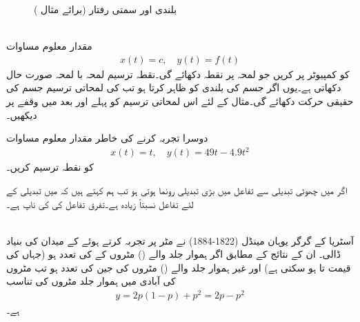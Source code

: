 %
\begin{figure}
\centering
{}
\caption{بلندی اور سمتی رفتار (برائے مثال )}
\label{شکل_مثال_تفرق_آزاد_گرنا}
\end{figure}

 \quad {} \\
مقدار معلوم مساوات
\begin{align*}
x(t)=c,\quad y(t)=f(t)
\end{align*}
کو کمپیوٹر پر   کریں جو لمحہ  پر نقطہ  دکھائے گی۔نقطہ ترسیم لمحہ با لمحہ صورت حال دکھاتی ہے۔یوں اگر  جسم کی بلندی کو ظاہر کرتا ہو تب  کی لمحاتی ترسیم جسم کی حقیقی حرکت دکھائے گی۔مثال  کے لئے اس لمحاتی ترسیم کو پہلے  اور بعد میں  وقفے پر دیکھیں۔

دوسرا تجربہ کرنے کی خاطر مقدار معلوم مساوات
\begin{align*}
x(t)=t,\quad y(t)=49t-4.9t^2
\end{align*}
کو نقطہ ترسیم کریں۔

اگر  میں چھوٹی تبدیلی سے  تفاعل  میں بڑی تبدیلی رونما ہوتی ہو تب ہم کہتے ہیں کہ   میں تبدیلی کے لئے  تفاعل نسبتاً زیادہ  ہے۔تفرق  تفاعل  کی  کی ناپ ہے۔

\quad {}\\
آسٹریا کے گرگر یوہان مینڈل (1822-1884) نے مٹر پر تجربہ کرتے ہوئے   کے میدان کی بنیاد ڈالی۔ ان کے نتائج کے مطابق اگر ہموار جلد والے () مٹروں   کے  کی تعدد  ہو (جہاں  کی قیمت  تا  ہو سکتی ہے) اور غیر  ہموار جلد والے () مٹروں کی جین کی تعدد  ہو تب مٹروں کی  آبادی میں ہموار جلد مٹروں کی تناسب
\begin{align*}
y=2p(1-p)+p^2=2p-p^2
\end{align*}
ہے۔

